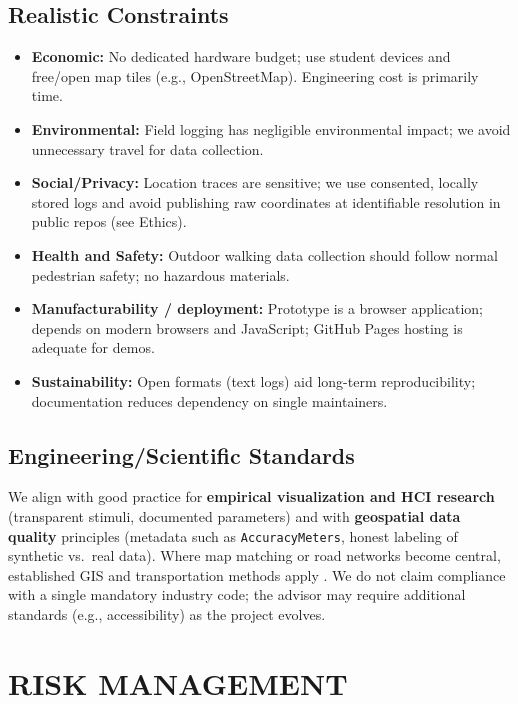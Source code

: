 \documentclass[12pt,a4paper]{article}
\begin{document}
\subsection{Realistic Constraints}

\begin{itemize}[leftmargin=1.5em]
    \item \textbf{Economic:} No dedicated hardware budget; use student devices and free/open map tiles (e.g., OpenStreetMap). Engineering cost is primarily time.
    \item \textbf{Environmental:} Field logging has negligible environmental impact; we avoid unnecessary travel for data collection.
    \item \textbf{Social/Privacy:} Location traces are sensitive; we use consented, locally stored logs and avoid publishing raw coordinates at identifiable resolution in public repos (see Ethics).
    \item \textbf{Health and Safety:} Outdoor walking data collection should follow normal pedestrian safety; no hazardous materials.
    \item \textbf{Manufacturability / deployment:} Prototype is a browser application; depends on modern browsers and JavaScript; GitHub Pages hosting is adequate for demos.
    \item \textbf{Sustainability:} Open formats (text logs) aid long-term reproducibility; documentation reduces dependency on single maintainers.
\end{itemize}

\subsection{Engineering/Scientific Standards}

We align with good practice for \textbf{empirical visualization and HCI research} (transparent stimuli, documented parameters) and with \textbf{geospatial data quality} principles (metadata such as \texttt{AccuracyMeters}, honest labeling of synthetic vs.\ real data). Where map matching or road networks become central, established GIS and transportation methods apply \cite{MillardBall2019}. We do not claim compliance with a single mandatory industry code; the advisor may require additional standards (e.g., accessibility) as the project evolves.

\section{RISK MANAGEMENT}
\end{document}
